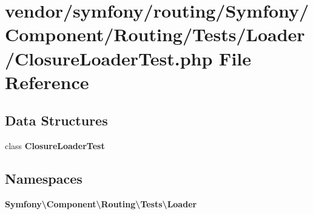 \section{vendor/symfony/routing/\+Symfony/\+Component/\+Routing/\+Tests/\+Loader/\+Closure\+Loader\+Test.php File Reference}
\label{_closure_loader_test_8php}
\subsection*{Data Structures}
\begin{DoxyCompactItemize}
\item 
class {\bf Closure\+Loader\+Test}
\end{DoxyCompactItemize}
\subsection*{Namespaces}
\begin{DoxyCompactItemize}
\item 
 {\bf Symfony\textbackslash{}\+Component\textbackslash{}\+Routing\textbackslash{}\+Tests\textbackslash{}\+Loader}
\end{DoxyCompactItemize}
